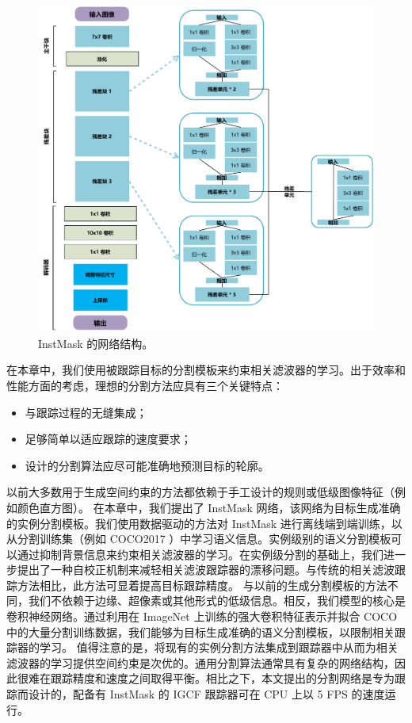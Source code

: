 \begin{figure}[t]
    \centering
    \includegraphics[width=1.0\textwidth]{Img/IGCF/net.pdf}
    \caption{InstMask 的网络结构。}
    \label{fig:IGCF_net}
\end{figure}

在本章中，我们使用被跟踪目标的分割模板来约束相关滤波器的学习。出于效率和性能方面的考虑，理想的分割方法应具有三个关键特点：

\begin{itemize}
\item 与跟踪过程的无缝集成；
\item 足够简单以适应跟踪的速度要求；
\item 设计的分割算法应尽可能准确地预测目标的轮廓。
\end{itemize}

以前大多数用于生成空间约束的方法都依赖于手工设计的规则或低级图像特征（例如颜色直方图）。
在本章中，我们提出了 InstMask 网络，该网络为目标生成准确的实例分割模板。我们使用数据驱动的方法对 InstMask 进行离线端到端训练，以从分割训练集（例如 COCO2017 \cite{COCO}）中学习语义信息。实例级别的语义分割模板可以通过抑制背景信息来约束相关滤波器的学习。在实例级分割的基础上，我们进一步提出了一种自校正机制来减轻相关滤波跟踪器的漂移问题。与传统的相关滤波跟踪方法相比，此方法可显着提高目标跟踪精度。
与以前的生成分割模板的方法不同，我们不依赖于边缘、超像素或其他形式的低级信息。相反，我们模型的核心是卷积神经网络。通过利用在 ImageNet \cite{ImageNet} 上训练的强大卷积特征表示并拟合 COCO 中的大量分割训练数据，我们能够为目标生成准确的语义分割模板，以限制相关跟踪器的学习。
值得注意的是，将现有的实例分割方法集成到跟踪器中从而为相关滤波器的学习提供空间约束是次优的。通用分割算法通常具有复杂的网络结构，因此很难在跟踪精度和速度之间取得平衡。相比之下，本文提出的分割网络是专为跟踪而设计的，配备有 InstMask 的 IGCF 跟踪器可在 CPU 上以 5 FPS 的速度运行。

